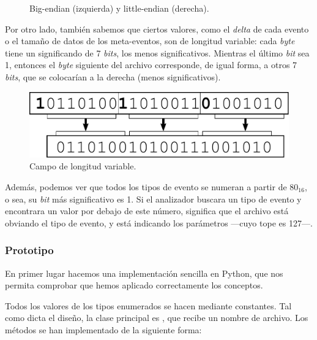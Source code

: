 \begin{figure}[H]
\begin{centering}
		\par\end{centering}
	\smallskip
	\caption[Big-endian y little-endian]{\label{fig:endianness} Big-endian (izquierda) y little-endian (derecha). \cite{wiki_endianness}}
\end{figure}
	
\smallskip

Por otro lado, también sabemos que ciertos valores, como el \textit{delta} de cada evento o el tamaño de datos de los meta-eventos, son de longitud variable: cada \textit{byte} tiene un significando de 7 \textit{bits}, los menos significativos. Mientras el último \textit{bit} sea 1, entonces el \textit{byte} siguiente del archivo corresponde, de igual forma, a otros 7 \textit{bits}, que se colocarían a la derecha (menos significativos).

\smallskip

\begin{figure}[H]
	\noindent \begin{centering}
		\includegraphics[width=\linewidth/2]{capitulo5/varlen}
		\par\end{centering}
	\smallskip
	\caption{\label{fig:varlen} Campo de longitud variable.}
\end{figure}

\smallskip

Además, podemos ver que todos los tipos de evento se numeran a partir de $80_{16}$, o sea, su \textit{bit} más significativo es 1. Si el analizador buscara un tipo de evento y encontrara un valor por debajo de este número, significa que el archivo está obviando el tipo de evento, y está indicando los parámetros ---cuyo tope es 127---.

\subsubsection{Prototipo}

En primer lugar hacemos una implementación sencilla en Python, que nos permita comprobar que hemos aplicado correctamente los conceptos.

Todos los valores de los tipos enumerados se hacen mediante constantes. Tal como dicta el diseño, la clase principal es , que recibe un nombre de archivo. Los métodos se han implementado de la siguiente forma:

